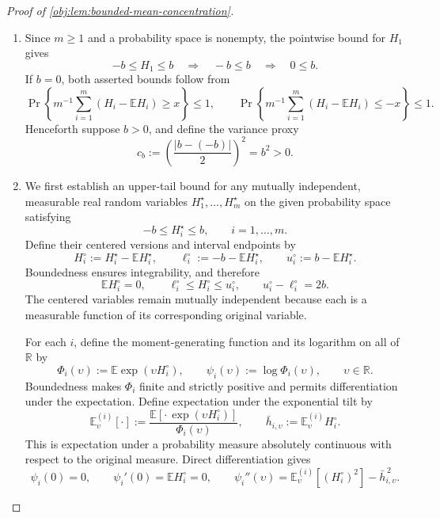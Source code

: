 \begin{proof}[Proof of \cref{obj:lem:bounded-mean-concentration}]
\begin{enumerate}
\item
Since \(m\ge1\) and a probability space is nonempty, the pointwise bound for \(H_1\) gives
\[
-b\le H_1\le b
\quad\Longrightarrow\quad
-b\le b
\quad\Longrightarrow\quad
0\le b.
\]
If \(b=0\), both asserted bounds follow from
\[
\Pr\left\{m^{-1}\sum_{i=1}^m(H_i-\mathbb EH_i)\ge x\right\}\le1,
\qquad
\Pr\left\{m^{-1}\sum_{i=1}^m(H_i-\mathbb EH_i)\le-x\right\}\le1.
\]
Henceforth suppose \(b>0\), and define the variance proxy
\[
c_b:=\left(\frac{|b-(-b)|}{2}\right)^2=b^2>0.
\]

\item
We first establish an upper-tail bound for any mutually independent, measurable real random variables \(H_1^\star,\ldots,H_m^\star\) on the given probability space satisfying
\[
-b\le H_i^\star\le b,
\qquad i=1,\ldots,m.
\]
Define their centered versions and interval endpoints by
\[
H_i^\circ:=H_i^\star-\mathbb EH_i^\star,
\qquad
\ell_i^\circ:=-b-\mathbb EH_i^\star,
\qquad
u_i^\circ:=b-\mathbb EH_i^\star.
\]
Boundedness ensures integrability, and therefore
\[
\mathbb EH_i^\circ=0,
\qquad
\ell_i^\circ\le H_i^\circ\le u_i^\circ,
\qquad
u_i^\circ-\ell_i^\circ=2b.
\]
The centered variables remain mutually independent because each is a measurable function of its corresponding original variable.

For each \(i\), define the moment-generating function and its logarithm on all of \(\mathbb R\) by
\[
\Phi_i(\upsilon):=\mathbb E\exp(\upsilon H_i^\circ),
\qquad
\psi_i(\upsilon):=\log\Phi_i(\upsilon),
\qquad \upsilon\in\mathbb R.
\]
Boundedness makes \(\Phi_i\) finite and strictly positive and permits differentiation under the expectation. Define expectation under the exponential tilt by
\[
\mathbb E_{\upsilon}^{(i)}[\cdot]
:=
\frac{\mathbb E[\cdot\,\exp(\upsilon H_i^\circ)]}{\Phi_i(\upsilon)},
\qquad
\bar h_{i,\upsilon}:=\mathbb E_{\upsilon}^{(i)}H_i^\circ.
\]
This is expectation under a probability measure absolutely continuous with respect to the original measure. Direct differentiation gives
\[
\psi_i(0)=0,
\qquad
\psi_i'(0)=\mathbb EH_i^\circ=0,
\qquad
\psi_i''(\upsilon)
=
\mathbb E_{\upsilon}^{(i)}[(H_i^\circ)^2]
-\bar h_{i,\upsilon}^{\,2}.
\]


\end{enumerate}
\end{proof}
